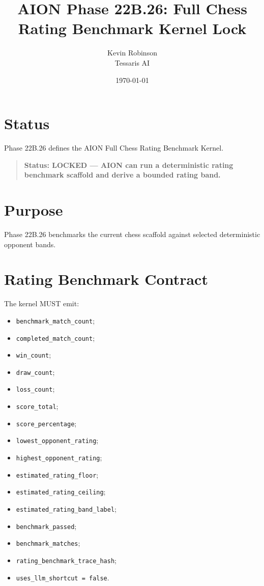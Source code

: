 \documentclass[11pt,a4paper]{article}
\title{\textbf{AION Phase 22B.26: Full Chess Rating Benchmark Kernel Lock}}
\author{Kevin Robinson\\Tessaris AI}
\date{\today}
\begin{document}
\maketitle

\section{Status}

Phase 22B.26 defines the AION Full Chess Rating Benchmark Kernel.

\begin{quote}
\textbf{Status: LOCKED --- AION can run a deterministic rating benchmark scaffold and derive a bounded rating band.}
\end{quote}

\section{Purpose}

Phase 22B.26 benchmarks the current chess scaffold against selected deterministic opponent bands.

\section{Rating Benchmark Contract}

The kernel MUST emit:

\begin{itemize}
  \item \texttt{benchmark\_match\_count};
  \item \texttt{completed\_match\_count};
  \item \texttt{win\_count};
  \item \texttt{draw\_count};
  \item \texttt{loss\_count};
  \item \texttt{score\_total};
  \item \texttt{score\_percentage};
  \item \texttt{lowest\_opponent\_rating};
  \item \texttt{highest\_opponent\_rating};
  \item \texttt{estimated\_rating\_floor};
  \item \texttt{estimated\_rating\_ceiling};
  \item \texttt{estimated\_rating\_band\_label};
  \item \texttt{benchmark\_passed};
  \item \texttt{benchmark\_matches};
  \item \texttt{rating\_benchmark\_trace\_hash};
  \item \texttt{uses\_llm\_shortcut = false}.
\end{itemize}
\end{document}
